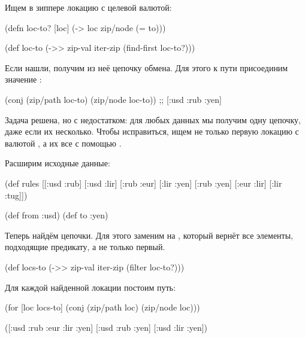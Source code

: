 Ищем в зиппере локацию с целевой валютой:

\begin{english}
  \begin{clojure}
(defn loc-to? [loc]
  (-> loc zip/node (= to)))

(def loc-to
  (->> zip-val
       iter-zip
       (find-first loc-to?)))
  \end{clojure}
\end{english}

Если нашли, получим из неё цепочку обмена. Для этого к пути присоединим значение
:

\begin{english}
  \begin{clojure}
(conj (zip/path loc-to) (zip/node loc-to))
;; [:usd :rub :yen]
  \end{clojure}
\end{english}

Задача решена, но с недостатком: для любых данных мы получим одну цепочку, даже
если их несколько. Чтобы исправиться, ищем не только первую локацию с валютой
, а их все с помощью .

Расширим исходные данные:

\begin{english}
  \begin{clojure}
(def rules
  [[:usd :rub]
   [:usd :lir]
   [:rub :eur]
   [:lir :yen]
   [:rub :yen]
   [:eur :lir]
   [:lir :tug]])

(def from :usd)
(def to :yen)
  \end{clojure}
\end{english}

Теперь найдём цепочки. Для этого заменим  на ,
который вернёт все элементы, подходящие предикату, а не только первый.

\begin{english}
  \begin{clojure}
(def locs-to
  (->> zip-val
       iter-zip
       (filter loc-to?)))
  \end{clojure}
\end{english}

Для каждой найденной локации постоим путь:

\begin{english}
  \begin{clojure}
(for [loc locs-to]
  (conj (zip/path loc) (zip/node loc)))

([:usd :rub :eur :lir :yen]
 [:usd :rub :yen]
 [:usd :lir :yen])
  \end{clojure}
\end{english}

